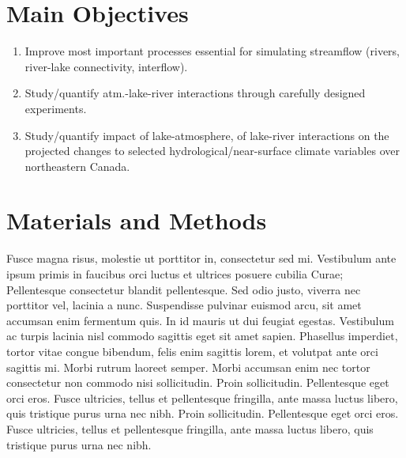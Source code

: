 \documentclass[a0,landscape]{a0poster}
\begin{document}
\begin{multicols}{3}

\color{DarkSlateGray} %

\section*{Main Objectives}

\begin{enumerate}
\item Improve most important processes essential for simulating streamflow (rivers, river-lake connectivity, interflow).
\item Study/quantify atm.-lake-river interactions through carefully designed experiments.
\item Study/quantify impact of lake-atmosphere, of lake-river interactions on the projected changes to selected hydrological/near-surface climate variables over northeastern Canada.
\end{enumerate}


\section*{Materials and Methods}

Fusce magna risus, molestie ut porttitor in, consectetur sed mi. Vestibulum ante ipsum primis in faucibus orci luctus et ultrices posuere cubilia Curae; Pellentesque consectetur blandit pellentesque. Sed odio justo, viverra nec porttitor vel, lacinia a nunc. Suspendisse pulvinar euismod arcu, sit amet accumsan enim fermentum quis. In id mauris ut dui feugiat egestas. Vestibulum ac turpis lacinia nisl commodo sagittis eget sit amet sapien. Phasellus imperdiet, tortor vitae congue bibendum, felis enim sagittis lorem, et volutpat ante orci sagittis mi. Morbi rutrum laoreet semper. Morbi accumsan enim nec tortor consectetur non commodo nisi sollicitudin. Proin sollicitudin. Pellentesque eget orci eros. Fusce ultricies, tellus et pellentesque fringilla, ante massa luctus libero, quis tristique purus urna nec nibh. Proin sollicitudin. Pellentesque eget orci eros. Fusce ultricies, tellus et pellentesque fringilla, ante massa luctus libero, quis tristique purus urna nec nibh.


\end{multicols}
\end{document}
